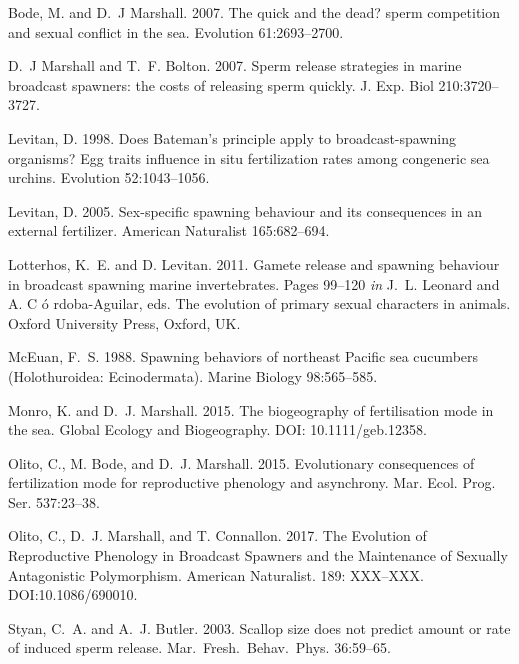 \documentclass{article}
\begin{document}
\begin{thebibliography}{}

Bode, M. and D.~J Marshall. 2007.
\newblock The quick and the dead? sperm competition and sexual conflict in the sea.
\newblock Evolution 61:2693--2700.

D.~J Marshall and T.~F. Bolton. 2007.
\newblock Sperm release strategies in marine broadcast spawners: the costs of releasing sperm quickly.
\newblock J. Exp. Biol 210:3720--3727.

Levitan, D. 1998.
\newblock Does Bateman's principle apply to broadcast-spawning organisms? Egg traits influence in situ fertilization rates among congeneric sea urchins.
\newblock Evolution 52:1043--1056.

Levitan, D. 2005.
\newblock Sex-specific spawning behaviour and its consequences in an external fertilizer.
\newblock American Naturalist 165:682--694.

Lotterhos, K.~E. and D. Levitan. 2011.
\newblock Gamete release and spawning behaviour in broadcast spawning marine invertebrates.
\newblock Pages 99--120 \emph{in} J.~L. Leonard and A. C \'{o} rdoba-Aguilar, eds. The evolution of primary sexual characters in animals. Oxford University Press, Oxford, UK.

McEuan, F.~S. 1988.
\newblock Spawning behaviors of northeast Pacific sea cucumbers (Holothuroidea: Ecinodermata).
\newblock Marine Biology 98:565--585.

Monro, K. and D.~J. Marshall. 2015.
\newblock The biogeography of fertilisation mode in the sea.
\newblock Global Ecology and Biogeography. DOI: 10.1111/geb.12358.

Olito, C., M. Bode, and D.~J. Marshall. 2015.
\newblock Evolutionary consequences of fertilization mode for reproductive phenology and asynchrony.
\newblock Mar. Ecol. Prog. Ser. 537:23--38.

Olito, C., D.~J. Marshall, and T. Connallon. 2017.
\newblock The Evolution of Reproductive Phenology in Broadcast Spawners and the Maintenance of Sexually Antagonistic Polymorphism.
\newblock American Naturalist. 189: XXX--XXX. DOI:10.1086/690010.

Styan, C.~A. and A.~J. Butler. 2003.
\newblock Scallop size does not predict amount or rate of induced sperm release.
\newblock Mar.~Fresh.~Behav.~Phys. 36:59--65.

\end{thebibliography}
\end{document}
